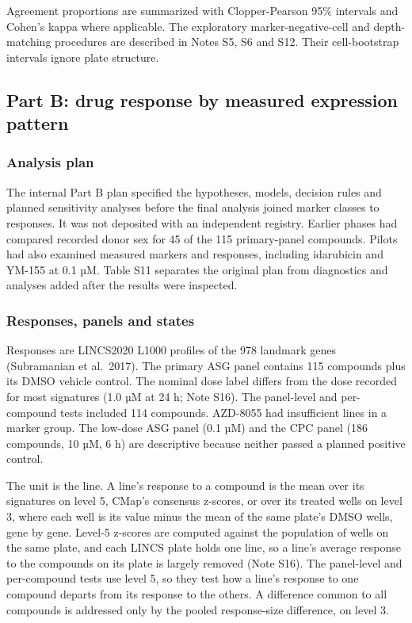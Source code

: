 \documentclass[
  11pt,
  letterpaper,
]{article}
\begin{document}
Agreement proportions are summarized with Clopper-Pearson 95\% intervals
and Cohen's kappa where applicable. The exploratory marker-negative-cell
and depth-matching procedures are described in Notes S5, S6 and S12.
Their cell-bootstrap intervals ignore plate structure.

\subsection{Part B: drug response by measured expression
pattern}\label{part-b-drug-response-by-measured-expression-pattern-1}

\subsubsection{Analysis plan}\label{analysis-plan}

The internal Part B plan specified the hypotheses, models, decision
rules and planned sensitivity analyses before the final analysis joined
marker classes to responses. It was not deposited with an independent
registry. Earlier phases had compared recorded donor sex for 45 of the
115 primary-panel compounds. Pilots had also examined measured markers
and responses, including idarubicin and YM-155 at 0.1 µM. Table S11
separates the original plan from diagnostics and analyses added after
the results were inspected.

\subsubsection{Responses, panels and
states}\label{responses-panels-and-states}

Responses are LINCS2020 L1000 profiles of the 978 landmark genes
(Subramanian et al.~2017). The primary ASG panel contains 115 compounds
plus its DMSO vehicle control. The nominal dose label differs from the
dose recorded for most signatures (1.0 µM at 24 h; Note S16). The
panel-level and per-compound tests included 114 compounds. AZD-8055 had
insufficient lines in a marker group. The low-dose ASG panel (0.1 µM)
and the CPC panel (186 compounds, 10 µM, 6 h) are descriptive because
neither passed a planned positive control.

The unit is the line. A line's response to a compound is the mean over
its signatures on level 5, CMap's consensus z-scores, or over its
treated wells on level 3, where each well is its value minus the mean of
the same plate's DMSO wells, gene by gene. Level-5 z-scores are computed
against the population of wells on the same plate, and each LINCS plate
holds one line, so a line's average response to the compounds on its
plate is largely removed (Note S16). The panel-level and per-compound
tests use level 5, so they test how a line's response to one compound
departs from its response to the others. A difference common to all
compounds is addressed only by the pooled response-size difference, on
level 3.
\end{document}

